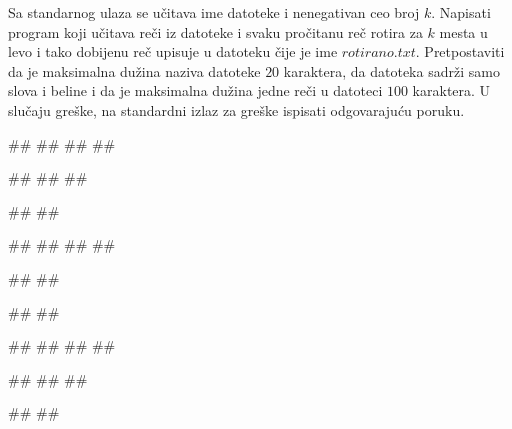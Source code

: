 \begin{Exercise}[label=p3_id18]         
Sa standarnog ulaza se učitava ime datoteke i nenegativan ceo
broj $k$. Napisati program koji učitava reči iz datoteke i svaku pročitanu reč
rotira za $k$ mesta u levo i tako dobijenu reč upisuje u datoteku čije je ime $rotirano.txt$. 
Pretpostaviti da je maksimalna dužina naziva datoteke $20$ karaktera, da
datoteka sadrži samo slova i beline i da je maksimalna dužina jedne reči u datoteci $100$ karaktera.
U slučaju greške, na standardni izlaz za greške ispisati odgovarajuću poruku.

\begin{minitest}
\begin{upotreba}{1}
#\naslovInt#
##
##
##

##
##
##

##
##
\end{upotreba}
\end{minitest}
\begin{minitest}
\begin{upotreba}{2}
#\naslovInt#
##
##
##

##
##

##
##
\end{upotreba}
\end{minitest}
\begin{minitest}
\begin{upotreba}{3}
#\naslovInt#
##
##
##

##
##
##

##
##
\end{upotreba}
\end{minitest}

\end{Exercise}
\begin{Answer}[ref=p3_id18]
\end{Answer}


